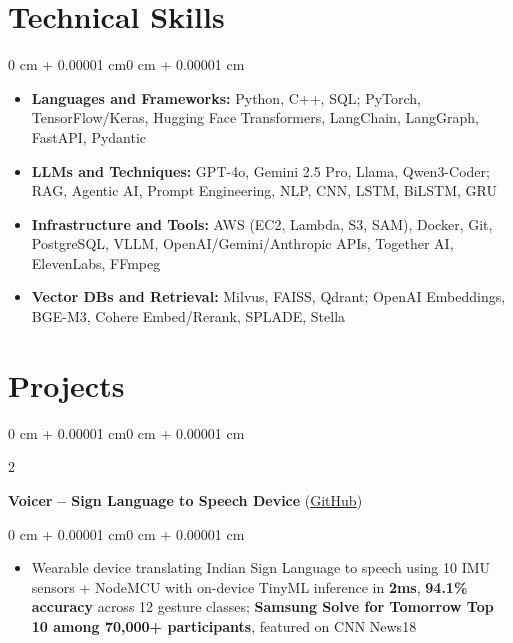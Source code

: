 \documentclass[10pt, letterpaper]{article}
\newenvironment{highlights}{
    \begin{itemize}[
        topsep=0.01 cm,
        parsep=0.01 cm,
        partopsep=0pt,
        itemsep=0pt,
        leftmargin=0 cm + 10pt
    ]
}{
    \end{itemize}
}
\newenvironment{highlightsforbulletentries}{
    \begin{itemize}[
        topsep=0.01 cm,
        parsep=0.01 cm,
        partopsep=0pt,
        itemsep=0pt,
        leftmargin=10pt
    ]
}{
    \end{itemize}
}
\newenvironment{onecolentry}{
    \begin{adjustwidth}{0 cm + 0.00001 cm}{0 cm + 0.00001 cm}
}{
    \end{adjustwidth}
}
\newenvironment{twocolentry}[2][]{
    \onecolentry
    \def\secondColumn{#2}
    \setcolumnwidth{\fill, 5.5 cm}
    \begin{paracol}{2}
}{
    \switchcolumn \raggedleft \secondColumn
    \end{paracol}
    \endonecolentry
}
\let\hrefWithoutArrow\href
\begin{document}
    \section{Technical Skills}

    \begin{onecolentry}
        \begin{highlightsforbulletentries}
            \item \textbf{Languages and Frameworks:} Python, C++, SQL; PyTorch, TensorFlow/Keras, Hugging Face Transformers, LangChain, LangGraph, FastAPI, Pydantic
            \item \textbf{LLMs and Techniques:} GPT-4o, Gemini 2.5 Pro, Llama, Qwen3-Coder; RAG, Agentic AI, Prompt Engineering, NLP, CNN, LSTM, BiLSTM, GRU
            \item \textbf{Infrastructure and Tools:} AWS (EC2, Lambda, S3, SAM), Docker, Git, PostgreSQL, VLLM, OpenAI/Gemini/Anthropic APIs, Together AI, ElevenLabs, FFmpeg
            \item \textbf{Vector DBs and Retrieval:} Milvus, FAISS, Qdrant; OpenAI Embeddings, BGE-M3, Cohere Embed/Rerank, SPLADE, Stella
        \end{highlightsforbulletentries}
    \end{onecolentry}

    \section{Projects}

        \begin{twocolentry}{
            2023
        }
            \textbf{Voicer -- Sign Language to Speech Device} (\hrefWithoutArrow{https://github.com/amit-gohel/voicer}{GitHub})
        \end{twocolentry}

        \vspace{0.02 cm}
        \begin{onecolentry}
            \begin{highlights}
                \item Wearable device translating Indian Sign Language to speech using 10 IMU sensors + NodeMCU with on-device TinyML inference in \textbf{2ms}, \textbf{94.1\% accuracy} across 12 gesture classes; \textbf{Samsung Solve for Tomorrow Top 10 among 70,000+ participants}, featured on CNN News18
            \end{highlights}
        \end{onecolentry}
\end{document}
